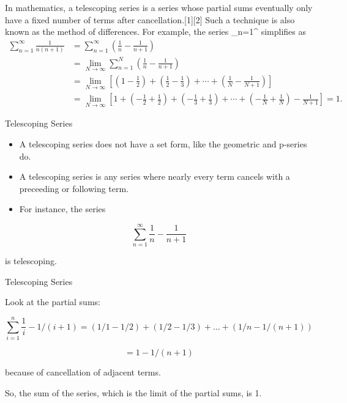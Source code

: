 In mathematics, a telescoping series is a series whose partial sums eventually only have a fixed number of terms after cancellation.[1][2] Such a technique is also known as the method of differences.
For example, the series
\sum_{n=1}^\infty{}
simplifies as
\begin{align}
\sum_{n=1}^\infty \frac{1}{n(n+1)} & {} = \sum_{n=1}^\infty \left( \frac{1}{n} - \frac{1}{n+1} \right) \\
{} & {} = \lim_{N\to\infty} \sum_{n=1}^N \left( \frac{1}{n} - \frac{1}{n+1} \right) \\
{} & {} = \lim_{N\to\infty} \left\lbrack {\left(1 - \frac{1}{2}\right) + \left(\frac{1}{2} - \frac{1}{3}\right) + \cdots + \left(\frac{1}{N} - \frac{1}{N+1}\right) } \right\rbrack  \\
{} & {} = \lim_{N\to\infty} \left\lbrack {  1 + \left( - \frac{1}{2} + \frac{1}{2}\right) + \left( - \frac{1}{3} + \frac{1}{3}\right) + \cdots + \left( - \frac{1}{N} + \frac{1}{N}\right) - \frac{1}{N+1} } \right\rbrack = 1.
\end{align}



	{Telescoping Series}
	
	
	\begin{itemize}
	\item A telescoping series does not have a set form, like the geometric and p-series do. \item A telescoping series is any series where nearly every term cancels with a preceeding or following term. \item For instance, the series
	\end{itemize}


\[   \sum^{\infty}_{n=1} \frac{1}{n} - \frac{1}{n+1} \]

is telescoping. 



	{Telescoping Series}
	
	Look at the partial sums:


\[   \sum^{n}_{i=1}  \frac{1}{i}  - 1/(i+1) = (1/1 - 1/2) + (1/2 - 1/3) + \ldots + (1/n - 1/(n+1))\]

\[= 1 - 1/(n+1)\]

because of cancellation of adjacent terms. 

So, the sum of the series, which is the limit of the partial sums, is 1.

